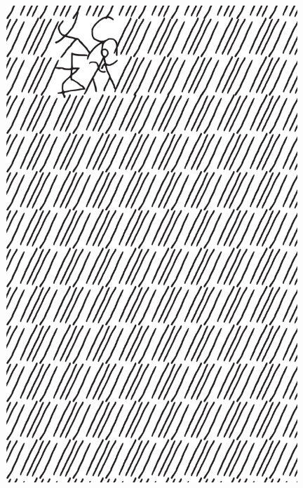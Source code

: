 \makeatletter\@openrightfalse
\movetooddpage
\begin{absolutelynopagebreak}
\begin{vplace}
\begin{figure}[H]
\begin{adjustwidth}{-0.99cm}{}
  \centering
  \vspace*{-1.77cm}
  \hspace*{-0.45cm}
  \includegraphics[width=110mm]{./imgs/img2.pdf}  
  \hfill
\end{adjustwidth}

\thispagestyle{empty}

\end{figure}
\end{vplace}

\end{absolutelynopagebreak}

